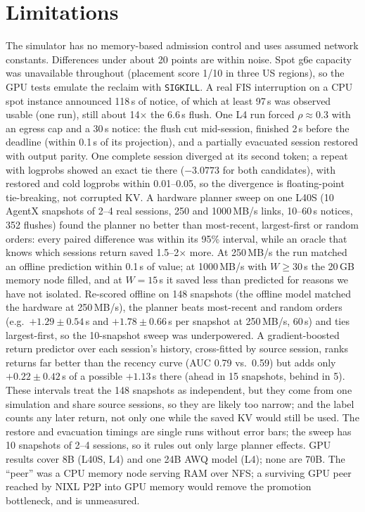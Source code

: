 \documentclass[10pt,twocolumn]{article}
\begin{document}
\section{Limitations}\label{sec:limits}
The simulator has no memory-based admission control and uses assumed network
constants. Differences under about 20 points are within noise. Spot g6e capacity was
unavailable throughout (placement score 1/10 in three US regions), so the GPU tests
emulate the reclaim with \texttt{SIGKILL}. A real FIS interruption on a CPU spot
instance announced 118\,s of notice, of which at least 97\,s was observed usable
(one run), still about 14$\times$ the 6.6\,s flush. One L4 run forced $\rho \approx
0.3$ with an egress cap and a 30\,s notice: the flush cut mid-session, finished 2\,s
before the deadline (within 0.1\,s of its projection), and a partially evacuated
session restored with output parity. One complete session diverged at its second token; a repeat with logprobs showed an
exact tie there ($-3.0773$ for both candidates), with restored and cold logprobs within
0.01--0.05, so the divergence is floating-point tie-breaking, not corrupted KV.
A hardware planner sweep on one L40S (10 AgentX snapshots of 2--4 real sessions, 250
and 1000\,MB/s links, 10--60\,s notices, 352 flushes) found the planner no better than
most-recent, largest-first or random orders: every paired difference was within its 95\%
interval, while an oracle that knows which sessions return saved 1.5--2$\times$ more. At
250\,MB/s the run matched an offline prediction within 0.1\,s of value; at 1000\,MB/s
with $W \ge 30$\,s the 20\,GB memory node filled, and at $W = 15$\,s it saved less than
predicted for reasons we have not isolated. Re-scored offline on 148 snapshots (the
offline model matched the hardware at 250\,MB/s), the planner beats most-recent and
random orders (e.g.\ $+1.29 \pm 0.54$\,s and $+1.78 \pm 0.66$\,s per snapshot at
250\,MB/s, 60\,s) and ties largest-first, so the 10-snapshot sweep was underpowered. A
gradient-boosted return predictor over each session's history, cross-fitted by source
session, ranks returns far better than the recency curve (AUC 0.79 vs.\ 0.59) but adds
only $+0.22 \pm 0.42$\,s of a possible $+1.13$\,s there (ahead in 15 snapshots, behind in
5). These intervals treat the 148 snapshots as independent, but they come from one
simulation and share source sessions, so they are likely too narrow; and the label counts
any later return, not only one while the saved KV would still be used. The restore and evacuation timings are single runs without
error bars; the sweep has 10 snapshots of 2--4 sessions, so it rules out only large
planner effects. GPU results cover 8B (L40S, L4) and one 24B AWQ model (L4); none are 70B. The
``peer'' was a CPU
memory node serving RAM over NFS; a surviving GPU peer reached by NIXL P2P into GPU
memory would remove the promotion bottleneck, and is unmeasured.
\end{document}
